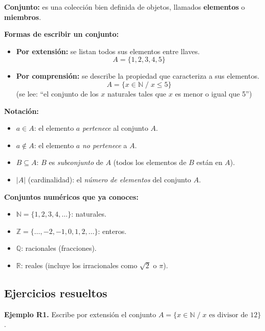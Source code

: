 \documentclass[12pt, letterpaper]{article}
\newcommand{\N}{\mathbb{N}}
\newcommand{\Z}{\mathbb{Z}}
\begin{document}
\begin{cuadroteoria}
  \textbf{Conjunto:} es una colección bien definida de objetos, llamados \textbf{elementos} o \textbf{miembros}.

  \textbf{Formas de escribir un conjunto:}
  \begin{itemize}[leftmargin=*]
    \item \textbf{Por extensión:} se listan todos sus elementos entre llaves.
          $$A = \{1, 2, 3, 4, 5\}$$
    \item \textbf{Por comprensión:} se describe la propiedad que caracteriza a sus elementos.
          $$A = \{x \in \N \;/\; x \leq 5\}$$
          (se lee: ``el conjunto de los $x$ naturales tales que $x$ es menor o igual que 5'')
  \end{itemize}

  \textbf{Notación:}
  \begin{itemize}[leftmargin=*]
    \item $a \in A$: el elemento $a$ \emph{pertenece} al conjunto $A$.
    \item $a \notin A$: el elemento $a$ \emph{no pertenece} a $A$.
    \item $B \subseteq A$: $B$ es \emph{subconjunto} de $A$ (todos los elementos de $B$ están en $A$).
    \item $|A|$ (cardinalidad): el \emph{número de elementos} del conjunto $A$.
  \end{itemize}
\end{cuadroteoria}

\begin{cuadroextra}
  \textbf{Conjuntos numéricos que ya conoces:}
  \begin{itemize}[leftmargin=*]
    \item $\N = \{1, 2, 3, 4, \ldots\}$: naturales.
    \item $\Z = \{\ldots, -2, -1, 0, 1, 2, \ldots\}$: enteros.
    \item $\mathbb{Q}$: racionales (fracciones).
    \item $\mathbb{R}$: reales (incluye los irracionales como $\sqrt{2}$ o $\pi$).
  \end{itemize}
\end{cuadroextra}

\subsection{Ejercicios resueltos}

\textbf{Ejemplo R1.} Escribe por extensión el conjunto $A = \{x \in \N \;/\; x \text{ es divisor de } 12\}$.
\end{document}
